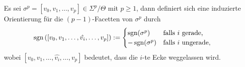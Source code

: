     \begin{definition}
      \label{defIndOri}
      Es sei \( \sigma^{p} = \left[ v_{0}, v_{1}, \ldots, v_{p} \right] \in \Sigma^{p}\slash\Theta \) mit \( p \ge 1 \), 
      dann definiert sich eine induzierte Orientierung für die \( (p-1) \)-Facetten von \( \sigma^{p} \) durch
      \begin{align}
        \mathop{\mathrm{sgn}}\nolimits\left( \left[ v_{0}, v_{1}, \ldots, \hat{v_{i}}, \ldots, v_{p} \right] \right) &:=
        \begin{cases}
          \mathop{\mathrm{sgn}}\nolimits(\sigma^{p}) & \text{falls } i \text{ gerade,} \\
          -\mathop{\mathrm{sgn}}\nolimits(\sigma^{p}) & \text{falls } i \text{ ungerade,} 
        \end{cases}
      \end{align}
      wobei \( \left[ v_{0}, v_{1}, \ldots, \hat{v_{i}}, \ldots, v_{p} \right] \) bedeutet, dass die \( i \)-te Ecke weggelassen wird.
    \end{definition}


